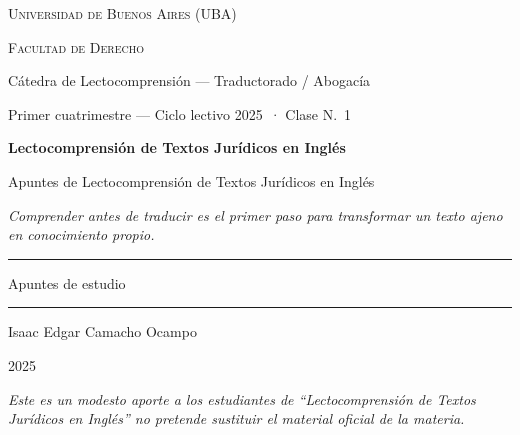 \documentclass[12pt,oneside]{book}
\newcommand{\universidad}{Universidad de Buenos Aires (UBA)}
\newcommand{\facultad}{Facultad de Derecho}
\newcommand{\carrera}{Cátedra de Lectocomprensión --- Traductorado / Abogacía}
\newcommand{\materia}{Lectocomprensión de Textos Jurídicos en Inglés}
\newcommand{\titulo}{Apuntes de Lectocomprensión de Textos Jurídicos en Inglés}
\newcommand{\autor}{Isaac Edgar Camacho Ocampo}
\newcommand{\anio}{2025}
\begin{document}
\begin{titlepage}

\thispagestyle{empty}

\begin{center}

\vspace*{1cm}

{\large \textsc{\universidad}}

\vspace{0.2cm}

{\large \textsc{\facultad}}

\vspace{0.2cm}

{\large \carrera}

\vspace{0.4cm}

{\normalsize Primer cuatrimestre --- Ciclo lectivo \anio\ · Clase N.\textordmasculine\ 1}

\vspace{3cm}

{\Huge \textbf{\materia}}

\vspace{1cm}

{\LARGE \titulo}

\vspace{0.8cm}

\textit{Comprender antes de traducir es el primer paso para transformar un texto ajeno en conocimiento propio.}

\vspace{1.2cm}

\rule{0.70\textwidth}{0.5pt}

\vspace{0.5cm}

{\large Apuntes de estudio}

\vspace{0.5cm}

\rule{0.70\textwidth}{0.5pt}

\vfill

{\large \autor}

\vspace{0.3cm}

{\large \anio}

\end{center}

\vfill

\begin{flushleft}
\textit{Este es un modesto aporte a los estudiantes de ``Lectocomprensión de Textos Jurídicos en Inglés'' no pretende sustituir el material oficial de la materia.}
\end{flushleft}

\end{titlepage}
\end{document}
